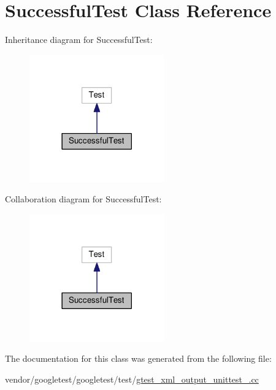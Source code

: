 \hypertarget{classSuccessfulTest}{}\section{Successful\+Test Class Reference}
\label{classSuccessfulTest}


Inheritance diagram for Successful\+Test\+:\nopagebreak
\begin{figure}[H]
\begin{center}
\leavevmode
\includegraphics[width=165pt]{classSuccessfulTest__inherit__graph}
\end{center}
\end{figure}


Collaboration diagram for Successful\+Test\+:\nopagebreak
\begin{figure}[H]
\begin{center}
\leavevmode
\includegraphics[width=165pt]{classSuccessfulTest__coll__graph}
\end{center}
\end{figure}


The documentation for this class was generated from the following file\+:\begin{DoxyCompactItemize}
\item 
vendor/googletest/googletest/test/\hyperlink{gtest__xml__output__unittest___8cc}{gtest\+\_\+xml\+\_\+output\+\_\+unittest\+\_\+.\+cc}\end{DoxyCompactItemize}
